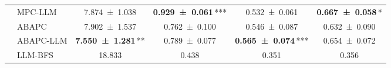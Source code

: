 \begin{table}[t]
{\begin{tabular}{l|lcccc}
     & MPC-LLM & \num{7.874 +- 1.038} & {\bfseries \num{0.929 +- 0.061}}\,\textnormal{***} & \num{0.532 +- 0.061} & {\bfseries \num{0.667 +- 0.058}}\,\textnormal{*} \\
     & ABAPC & \num{7.902 +- 1.537} & \num{0.762 +- 0.100} & \num{0.546 +- 0.087} & \num{0.632 +- 0.090} \\
     & ABAPC-LLM & {\bfseries \num{7.550 +- 1.281}}\,\textnormal{**} & \num{0.789 +- 0.077} & {\bfseries \num{0.565 +- 0.074}}\,\textnormal{***} & \num{0.654 +- 0.072} \\
     & LLM-BFS & \num{18.833} & \num{0.438} & \num{0.351} & \num{0.356} \\
    \bottomrule
    \end{tabular}
    }
\end{table}
